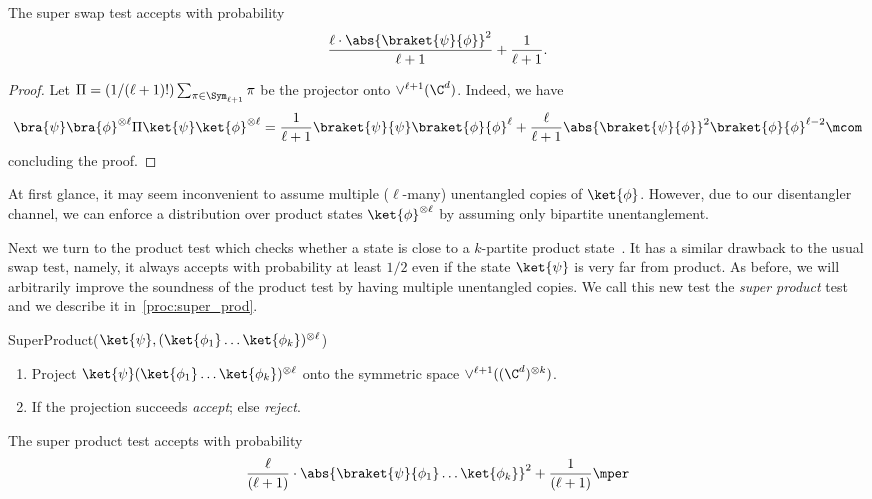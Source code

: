 \begin{lemma}\label{lem:super_swap}
  The super swap test accepts with probability 
  \[\frac{\ell \cdot \abs{\braket{\psi}{\phi}}^2}{\ell+1} + \frac{1}{\ell+1}.\]
\end{lemma}

\begin{proof}
  Let $\Pi = (1/(\ell+1)!) \sum_{\pi \in \Sym_{\ell+1}} \pi$ be the projector onto $\vee^{\ell+1}(\C^{d})$. Indeed, we have
  \begin{align*}
    \bra{\psi}\bra{\phi}^{\otimes \ell} \Pi \ket{\psi}\ket{\phi}^{\otimes \ell} = \frac{1}{\ell+1} \braket{\psi}{\psi} \braket{\phi}{\phi}^{\ell} + \frac{\ell}{\ell+1} \abs{\braket{\psi}{\phi}}^2 \braket{\phi}{\phi}^{\ell-2}\mcom
  \end{align*}
  concluding the proof.
\end{proof}

At first glance, it may seem inconvenient to assume multiple ($\ell$-many) unentangled copies of $\ket{\phi}$.
However, due to our disentangler channel, we can enforce a distribution over product states $\ket{\phi}^{\otimes \ell}$ by assuming
only bipartite unentanglement.

Next we turn to the product test which checks whether a state is close to a $k$-partite product state~\cite{HM13}.
It has a similar drawback to the usual swap test, namely, it always accepts with probability at least $1/2$
even if the state $\ket{\psi}$ is very far from product. As before, we will arbitrarily improve the soundness of the product test
by having multiple unentangled copies. We call this new test the \emph{super product} test and we describe it in~\cref{proc:super_prod}.

\begin{algorithm}{SuperProduct}{($\ket{\psi},(\ket{\phi_1}\ldots\ket{\phi_k})^{\otimes \ell}$)}
     \begin{enumerate}
           \item Project $\ket{\psi}(\ket{\phi_1}\ldots\ket{\phi_k})^{\otimes \ell}$ onto the symmetric space $\vee^{\ell+1}((\C^{d})^{\otimes k})$.
          \item If the projection succeeds \emph{accept};        
            else \emph{reject}.
     \end{enumerate}
     \caption{Super Product Test}\label{proc:super_prod}
\end{algorithm}

\begin{lemma}
  The super product test accepts with probability
    \[ 
  \frac{\ell}{(\ell+1)} \cdot \abs{\braket{\psi}{\phi_1}\ldots\ket{\phi_k}}^2 + \frac{1}{(\ell+1)}\mper
    \] 
\end{lemma}

